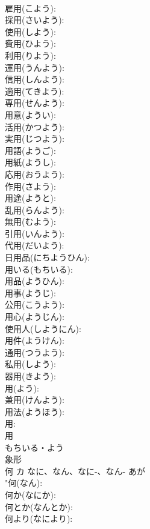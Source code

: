 \documentclass[8pt]{extreport}
\begin{document}
\begin{CJK}{UTF8}{min}
\\	雇用(こよう): 
\\	採用(さいよう): 
\\	使用(しよう): 
\\	費用(ひよう): 
\\	利用(りよう): 
\\	運用(うんよう): 
\\	信用(しんよう): 
\\	適用(てきよう): 
\\	専用(せんよう): 
\\	用意(ようい): 
\\	活用(かつよう): 
\\	実用(じつよう): 
\\	用語(ようご): 
\\	用紙(ようし): 
\\	応用(おうよう): 
\\	作用(さよう): 
\\	用途(ようと): 
\\	乱用(らんよう): 
\\	無用(むよう): 
\\	引用(いんよう): 
\\	代用(だいよう): 
\\	日用品(にちようひん): 
\\	用いる(もちいる): 
\\	用品(ようひん): 
\\	用事(ようじ): 
\\	公用(こうよう): 
\\	用心(ようじん): 
\\	使用人(しようにん): 
\\	用件(ようけん): 
\\	通用(つうよう): 
\\	私用(しよう): 
\\	器用(きよう): 
\\	用(よう): 
\\	兼用(けんよう): 
\\	用法(ようほう): 
\\	用: 
\\	用	
\\	もちいる・よう	
\\	象形 
\\	何	カ	なに、なん、なに-、なん-	あが	
\\	"何(なん): 
\\	何か(なにか): 
\\	何とか(なんとか): 
\\	何より(なにより): 

\end{CJK}
\end{document}
